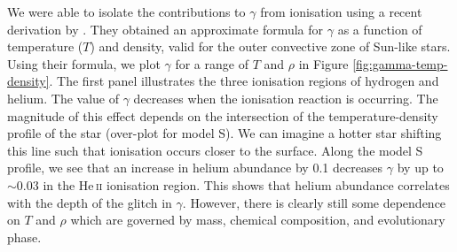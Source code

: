 We were able to isolate the contributions to \(\gamma\) from ionisation using a recent derivation by \citet{Houdayer.Reese.ea2021}. They obtained an approximate formula for \(\gamma\) as a function of temperature (\(T\)) and density, valid for the outer convective zone of Sun-like stars. Using their formula, we plot \(\gamma\) for a range of \(T\) and \(\rho\) in Figure \ref{fig:gamma-temp-density}. The first panel illustrates the three ionisation regions of hydrogen and helium. The value of \(\gamma\) decreases when the ionisation reaction is occurring. The magnitude of this effect depends on the intersection of the temperature-density profile of the star (over-plot for model S). We can imagine a hotter star shifting this line such that ionisation occurs closer to the surface. Along the model S profile, we see that an increase in helium abundance by 0.1 decreases \(\gamma\) by up to \(\sim 0.03\) in the He\,\textsc{ii} ionisation region. This shows that helium abundance correlates with the depth of the glitch in \(\gamma\). However, there is clearly still some dependence on \(T\) and \(\rho\) which are governed by mass, chemical composition, and evolutionary phase.

